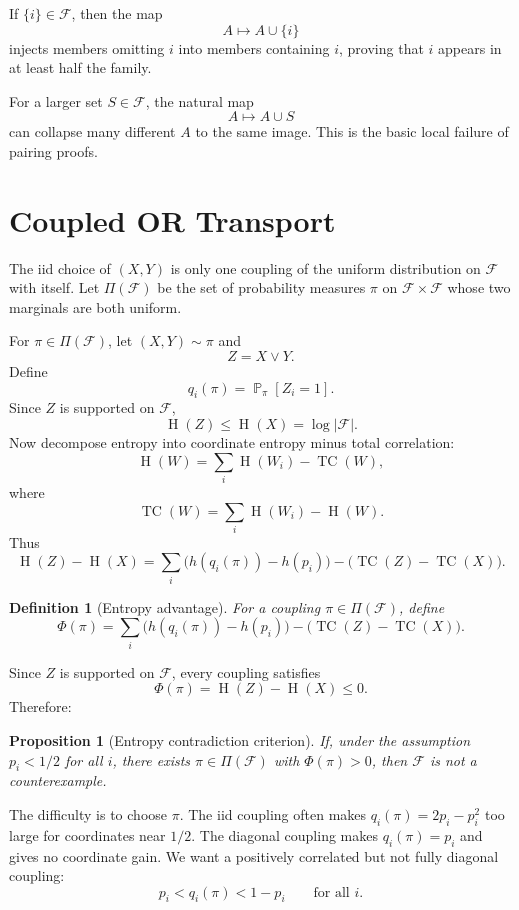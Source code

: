\documentclass[11pt]{article}
\newtheorem{proposition}{Proposition}
\newtheorem{definition}{Definition}
\DeclareMathOperator{\TC}{TC}
\DeclareMathOperator{\Ent}{H}
\DeclareMathOperator{\Prb}{\mathbb{P}}
\begin{document}
If $\{i\} \in \mathcal{F}$, then the map
\[
  A \mapsto A \cup \{i\}
\]
injects members omitting $i$ into members containing $i$, proving that $i$
appears in at least half the family.

For a larger set $S \in \mathcal{F}$, the natural map
\[
  A \mapsto A \cup S
\]
can collapse many different $A$ to the same image.  This is the basic local
failure of pairing proofs.

\section{Coupled OR Transport}

The iid choice of $(X,Y)$ is only one coupling of the uniform distribution on
$\mathcal{F}$ with itself.  Let $\Pi(\mathcal{F})$ be the set of probability
measures $\pi$ on $\mathcal{F} \times \mathcal{F}$ whose two marginals are both
uniform.

For $\pi \in \Pi(\mathcal{F})$, let $(X,Y) \sim \pi$ and
\[
  Z = X \vee Y.
\]
Define
\[
  q_i(\pi) = \Prb_\pi[Z_i=1].
\]
Since $Z$ is supported on $\mathcal{F}$,
\[
  \Ent(Z) \leq \Ent(X)=\log|\mathcal{F}|.
\]
Now decompose entropy into coordinate entropy minus total correlation:
\[
  \Ent(W)
  =
  \sum_i \Ent(W_i) - \TC(W),
\]
where
\[
  \TC(W) = \sum_i \Ent(W_i) - \Ent(W).
\]
Thus
\[
  \Ent(Z)-\Ent(X)
  =
  \sum_i \bigl(h(q_i(\pi))-h(p_i)\bigr)
  -
  \bigl(\TC(Z)-\TC(X)\bigr).
\]

\begin{definition}[Entropy advantage]
For a coupling $\pi \in \Pi(\mathcal{F})$, define
\[
  \Phi(\pi)
  =
  \sum_i \bigl(h(q_i(\pi))-h(p_i)\bigr)
  -
  \bigl(\TC(Z)-\TC(X)\bigr).
\]
\end{definition}

Since $Z$ is supported on $\mathcal{F}$, every coupling satisfies
\[
  \Phi(\pi) = \Ent(Z)-\Ent(X) \leq 0.
\]
Therefore:

\begin{proposition}[Entropy contradiction criterion]
If, under the assumption $p_i<1/2$ for all $i$, there exists
$\pi\in\Pi(\mathcal{F})$ with $\Phi(\pi)>0$, then $\mathcal{F}$ is not a
counterexample.
\end{proposition}

The difficulty is to choose $\pi$.  The iid coupling often makes
$q_i(\pi)=2p_i-p_i^2$ too large for coordinates near $1/2$.  The diagonal
coupling makes $q_i(\pi)=p_i$ and gives no coordinate gain.  We want a
positively correlated but not fully diagonal coupling:
\[
  p_i < q_i(\pi) < 1-p_i
  \qquad \text{for all } i.
\]
\end{document}
